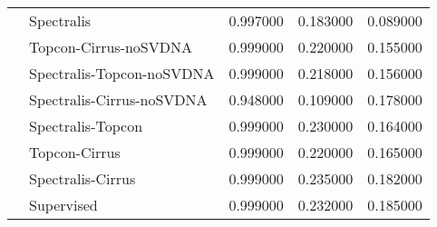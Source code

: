 \begin{tabular}{llrrr}
 & Spectralis & 0.997000 & 0.183000 & 0.089000 \\
 & Topcon-Cirrus-noSVDNA & 0.999000 & 0.220000 & 0.155000 \\
 & Spectralis-Topcon-noSVDNA & 0.999000 & 0.218000 & 0.156000 \\
 & Spectralis-Cirrus-noSVDNA & 0.948000 & 0.109000 & 0.178000 \\
 & Spectralis-Topcon & 0.999000 & 0.230000 & 0.164000 \\
 & Topcon-Cirrus & 0.999000 & 0.220000 & 0.165000 \\
 & Spectralis-Cirrus & 0.999000 & 0.235000 & 0.182000 \\
 & Supervised & 0.999000 & 0.232000 & 0.185000 \\
\cline{1-5}
\bottomrule
\end{tabular}
